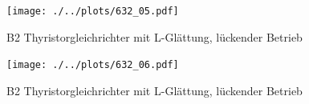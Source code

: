 \begin{figure}[h!]
    \centering
    \texttt{[image: ./../plots/632\_05.pdf]}
    \caption{B2 Thyristorgleichrichter mit L-Glättung, lückender Betrieb}
\end{figure}

\begin{figure}[h!]
    \centering
    \texttt{[image: ./../plots/632\_06.pdf]}
    \caption{B2 Thyristorgleichrichter mit L-Glättung, lückender Betrieb}
\end{figure}

\clearpage
